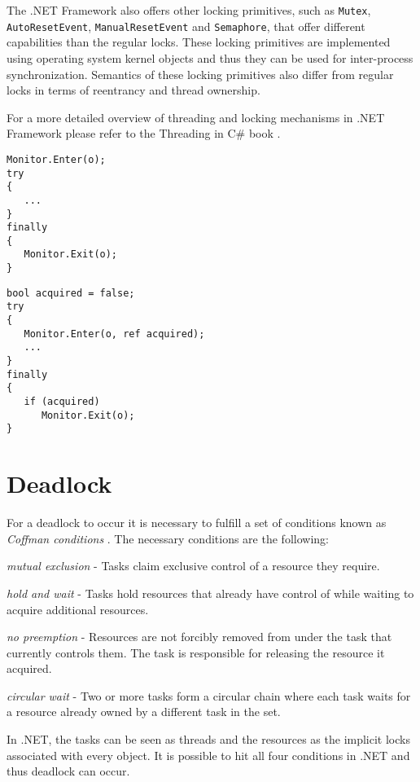 The .NET Framework also offers other locking primitives, such as \texttt{Mutex}, \texttt{AutoResetEvent}, \texttt{ManualResetEvent} and \texttt{Semaphore}, that offer different capabilities than the regular locks. These locking primitives are implemented using operating system kernel objects and thus they can be used for inter-process synchronization. Semantics of these locking primitives also differ from regular locks in terms of reentrancy and thread ownership.

For a more detailed overview of threading and locking mechanisms in .NET Framework please refer to the Threading in C\# book \citep{Albahari2006}.

\begin{lstlisting}[language=CSharp,caption=lock(o) construct in C\# 2.0,label=fig:lock20]
Monitor.Enter(o);
try
{
   ...
}
finally
{
   Monitor.Exit(o);
}
\end{lstlisting}

\begin{lstlisting}[language=CSharp,caption=lock(o) construct in C\# 4.0,label=fig:lock40]
bool acquired = false;
try
{
   Monitor.Enter(o, ref acquired);
   ...
}
finally
{
   if (acquired)
      Monitor.Exit(o);
}
\end{lstlisting}

\section{Deadlock}

For a deadlock to occur it is necessary to fulfill a set of conditions known as \emph{Coffman conditions} \citep{Coffman1971}. The necessary conditions are the following:
\begin{itemize*}
\item \emph{mutual exclusion} - Tasks claim exclusive control of a resource they require.
\item \emph{hold and wait} - Tasks hold resources that already have control of while waiting to acquire additional resources.
\item \emph{no preemption} - Resources are not forcibly removed from under the task that currently controls them. The task is responsible for releasing the resource it acquired.
\item \emph{circular wait} - Two or more tasks form a circular chain where each task waits for a resource already owned by a different task in the set.
\end{itemize*}

In .NET, the tasks can be seen as threads and the resources as the implicit locks associated with every object. It is possible to hit all four conditions in .NET and thus deadlock can occur. 

